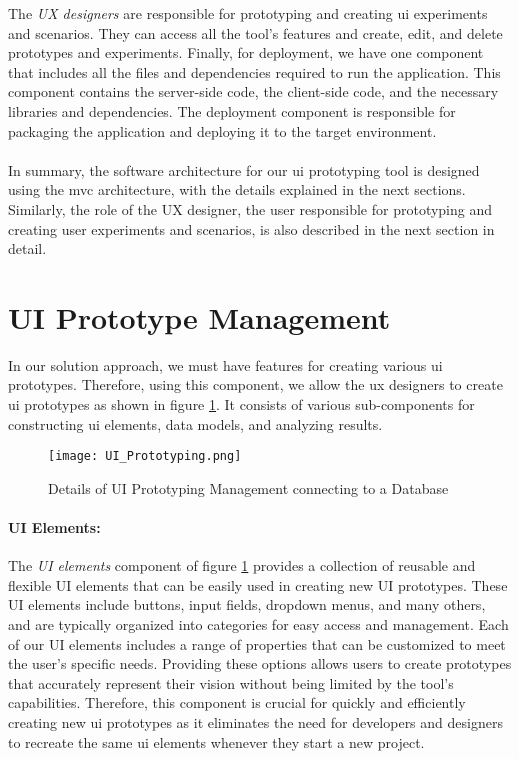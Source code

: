 The \textit{UX designers} are responsible for prototyping and creating \ac{ui} experiments and scenarios. 
They can access all the tool's features and create, edit, and delete prototypes and experiments.
Finally, for deployment, we have one component that includes all the files and dependencies required to run the application. 
This component contains the server-side code, the client-side code, and the necessary libraries and dependencies. 
The deployment component is responsible for packaging the application and deploying it to the target environment.\\\\
In summary, the software architecture for our \ac{ui} prototyping tool is designed using the \ac{mvc} architecture, with the details explained in the next sections. 
Similarly, the role of the UX designer, the user responsible for prototyping and creating user experiments and scenarios, is also described in the next section in detail.

\clearpage
\section{UI Prototype Management}
\label{sc:section:prototyping}
In our solution approach, we must have features for creating various \ac{ui} prototypes.
Therefore, using this component, we allow the \ac{ux} designers to create \ac{ui} prototypes as shown in figure \ref{fig:sc:prototyping}.
It consists of various sub-components for constructing \ac{ui} elements, data models, and analyzing results.
\begin{figure}[htbp!]
    \centering    
    \texttt{[image: UI\_Prototyping.png]} 
    \caption[Details of UI Prototyping Management]{Details of UI Prototyping Management connecting to a Database}
    \label{fig:sc:prototyping}
\end{figure}

\paragraph{UI Elements:}
The \textit{UI elements} component of figure \ref{fig:sc:prototyping} provides a collection of reusable and flexible UI elements that can be easily used in creating new UI prototypes.
These UI elements include buttons, input fields, dropdown menus, and many others, and are typically organized into categories for easy access and management. 
Each of our UI elements includes a range of properties that can be customized to meet the user's specific needs. 
Providing these options allows users to create prototypes that accurately represent their vision without being limited by the tool's capabilities.
Therefore, this component is crucial for quickly and efficiently creating new \ac{ui} prototypes as it eliminates the need for developers and designers to recreate the same \ac{ui} elements whenever they start a new project.

